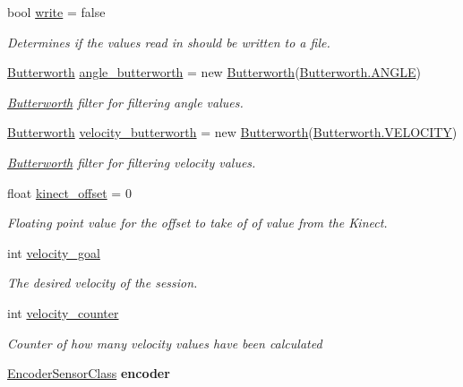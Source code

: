 \begin{DoxyCompactItemize}
\item 
bool \hyperlink{classkinect_expirement_1_1_kinect_form_a2faba08ba3886e70886d6289dcc09896}{write} = false
\begin{DoxyCompactList}\small\item\em Determines if the values read in should be written to a file. \end{DoxyCompactList}\item 
\hyperlink{classkinect_expirement_1_1_butterworth}{Butterworth} \hyperlink{classkinect_expirement_1_1_kinect_form_abec90e6db4a70d6cccc38f90f800e3ab}{angle\+\_\+butterworth} = new \hyperlink{classkinect_expirement_1_1_butterworth}{Butterworth}(\hyperlink{classkinect_expirement_1_1_butterworth_ac991123445c654cb0da7d7841e313b2c}{Butterworth.\+A\+N\+G\+LE})
\begin{DoxyCompactList}\small\item\em \hyperlink{classkinect_expirement_1_1_butterworth}{Butterworth} filter for filtering angle values. \end{DoxyCompactList}\item 
\hyperlink{classkinect_expirement_1_1_butterworth}{Butterworth} \hyperlink{classkinect_expirement_1_1_kinect_form_a7f1502bd90febb3137d8e4fdf71d52ec}{velocity\+\_\+butterworth} = new \hyperlink{classkinect_expirement_1_1_butterworth}{Butterworth}(\hyperlink{classkinect_expirement_1_1_butterworth_afc717929ffc8d554b7e0263e2b06806a}{Butterworth.\+V\+E\+L\+O\+C\+I\+TY})
\begin{DoxyCompactList}\small\item\em \hyperlink{classkinect_expirement_1_1_butterworth}{Butterworth} filter for filtering velocity values. \end{DoxyCompactList}\item 
float \hyperlink{classkinect_expirement_1_1_kinect_form_a97a0dd9256e1093328fafccaca672398}{kinect\+\_\+offset} = 0
\begin{DoxyCompactList}\small\item\em Floating point value for the offset to take of of value from the Kinect. \end{DoxyCompactList}\item 
int \hyperlink{classkinect_expirement_1_1_kinect_form_a6334825924ef2914544c0c96c0ad0572}{velocity\+\_\+goal}
\begin{DoxyCompactList}\small\item\em The desired velocity of the session. \end{DoxyCompactList}\item 
int \hyperlink{classkinect_expirement_1_1_kinect_form_aedd93118198e798ee966ff768038bac1}{velocity\+\_\+counter}
\begin{DoxyCompactList}\small\item\em Counter of how many velocity values have been calculated \end{DoxyCompactList}\item 
\hyperlink{classkinect_expirement_1_1_encoder_sensor_class}{Encoder\+Sensor\+Class} {\bfseries encoder}\hypertarget{classkinect_expirement_1_1_kinect_form_a84783ffbc816e15191e90aaab8f965c6}{}\label{classkinect_expirement_1_1_kinect_form_a84783ffbc816e15191e90aaab8f965c6}


\end{DoxyCompactItemize}
